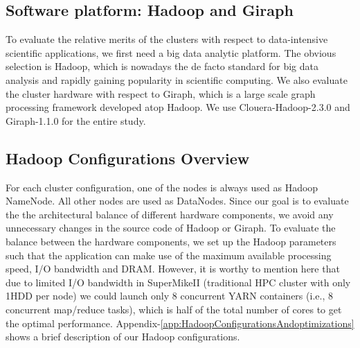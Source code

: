\documentclass[journal]{IEEEtran}
\begin{document}
\subsection{Software platform: Hadoop and Giraph}
To evaluate the relative merits of the clusters with respect to data-intensive scientific applications, we first need a big data analytic platform. The obvious selection is Hadoop, which is nowadays the de facto standard for big data analysis and rapidly gaining popularity in scientific computing. We also evaluate the cluster hardware with respect to Giraph, which is a large scale graph processing framework developed atop Hadoop. We use Clouera-Hadoop-2.3.0 and Giraph-1.1.0 for the entire study. 

\subsection{Hadoop Configurations Overview}
For each cluster configuration, one of the nodes is always used as Hadoop NameNode. All other nodes are used as DataNodes. Since our goal is to evaluate the  the architectural balance of different hardware components, we avoid any unnecessary changes in the source code of Hadoop or Giraph. To evaluate the balance between the hardware components, we set up the Hadoop parameters such that the application can make use of the maximum available processing speed, I/O bandwidth and DRAM. However, it is worthy to mention here that due to limited I/O bandwidth in SuperMikeII (traditional HPC cluster with only 1HDD per node) we could launch only 8 concurrent YARN containers (i.e., 8 concurrent map/reduce tasks), which is half of the total number of cores to get the optimal performance. Appendix-\ref{app:HadoopConfigurationsAndoptimizations} shows a brief description of our Hadoop configurations.
\end{document}
